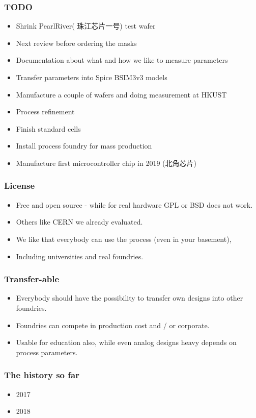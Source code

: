 \documentclass{beamer}
\begin{document}
\begin{frame}
	\frametitle{TODO}
	\begin{itemize}
		\item Shrink PearlRiver( 珠江芯片一号) test wafer
		\item Next review before ordering the masks
		\item Documentation about what and how we like to measure parameters
		\item Transfer parameters into Spice BSIM3v3 models
		\item Manufacture a couple of wafers and doing measurement at HKUST
		\item Process refinement
		\item Finish standard cells
		\item Install process foundry for mass production
		\item Manufacture first microcontroller chip in 2019 (北角芯片)
	\end{itemize}
\end{frame}

\begin{frame}
	\frametitle{License}
	\begin{itemize}
		\item Free and open source - while for real hardware GPL or BSD does not work.
		\item Others like CERN we already evaluated.
		\item We like that everybody can use the process (even in your basement),
		\item Including universities and real foundries.
	\end{itemize}
\end{frame}

\begin{frame}
	\frametitle{Transfer-able}
	\begin{itemize}
		\item Everybody should have the possibility to transfer own designs into other foundries.
		\item Foundries can compete in production cost and / or corporate.
		\item Usable for education also, while even analog designs heavy depends on process parameters.
	\end{itemize}
\end{frame}

\begin{frame}
	\frametitle{The history so far}
	\begin{itemize}
		\item 2017
		\item 2018
	\end{itemize}
\end{frame}
\end{document}
